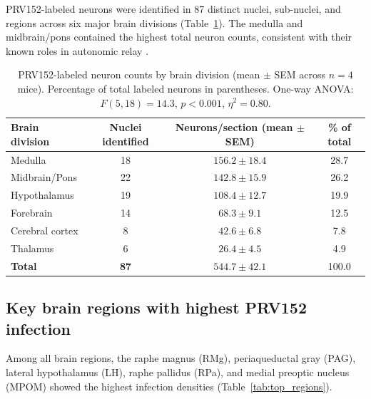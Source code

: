 \documentclass[11pt]{article}
\begin{document}
PRV152-labeled neurons were identified in 87 distinct nuclei, sub-nuclei, and regions across six major brain divisions (Table~\ref{tab:divisions}). The medulla and midbrain/pons contained the highest total neuron counts, consistent with their known roles in autonomic relay \citep{morrison2001}.

\begin{table}[H]
\centering
\caption{PRV152-labeled neuron counts by brain division (mean $\pm$ SEM across $n = 4$ mice). Percentage of total labeled neurons in parentheses. One-way ANOVA: $F(5,18) = 14.3$, $p < 0.001$, $\eta^2 = 0.80$.}
\label{tab:divisions}
\begin{tabular}{lccc}
\toprule
\textbf{Brain division} & \textbf{Nuclei identified} & \textbf{Neurons/section (mean $\pm$ SEM)} & \textbf{\% of total} \\
\midrule
Medulla & 18 & $156.2 \pm 18.4$ & 28.7 \\
Midbrain/Pons & 22 & $142.8 \pm 15.9$ & 26.2 \\
Hypothalamus & 19 & $108.4 \pm 12.7$ & 19.9 \\
Forebrain & 14 & $68.3 \pm 9.1$ & 12.5 \\
Cerebral cortex & 8 & $42.6 \pm 6.8$ & 7.8 \\
Thalamus & 6 & $26.4 \pm 4.5$ & 4.9 \\
\midrule
\textbf{Total} & \textbf{87} & $544.7 \pm 42.1$ & 100.0 \\
\bottomrule
\end{tabular}
\end{table}

\subsection{Key brain regions with highest PRV152 infection}

Among all brain regions, the raphe magnus (RMg), periaqueductal gray (PAG), lateral hypothalamus (LH), raphe pallidus (RPa), and medial preoptic nucleus (MPOM) showed the highest infection densities (Table~\ref{tab:top_regions}).
\end{document}
